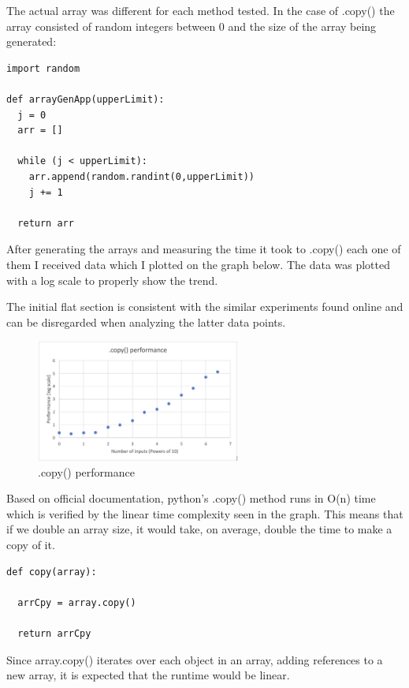 \documentclass[12pt]{article}
\begin{document}
The actual array was different for each method tested. In the case of .copy() the array consisted of random integers between 0 and the size of the array being generated:

\footnotesize
\begin{verbatim}
import random

def arrayGenApp(upperLimit):
  j = 0
  arr = []

  while (j < upperLimit):
    arr.append(random.randint(0,upperLimit))
    j += 1

  return arr
\end{verbatim}
\normalsize

After generating the arrays and measuring the time it took to .copy() each one of them I received data which I plotted on the graph below. The data was plotted with a log scale to properly show the trend.

The initial flat section is consistent with the similar experiments found online and can be disregarded when analyzing the latter data points.

\begin{figure}[H]
\centering
\includegraphics[width=0.6\textwidth,height=\textheight,keepaspectratio]{copygraph.png}
\caption{.copy() performance}
\label{Figure: copygraph}
\end{figure}

Based on official documentation, python's .copy() method runs in O(n) time which is verified by the linear time complexity seen in the graph. This means that if we double an array size, it would take, on average, double the time to make a copy of it. 

\footnotesize
\begin{verbatim}
def copy(array):

  arrCpy = array.copy()

  return arrCpy
\end{verbatim}
\normalsize

Since array.copy() iterates over each object in an array, adding references to a new array, it is expected that the runtime would be linear.
\end{document}

